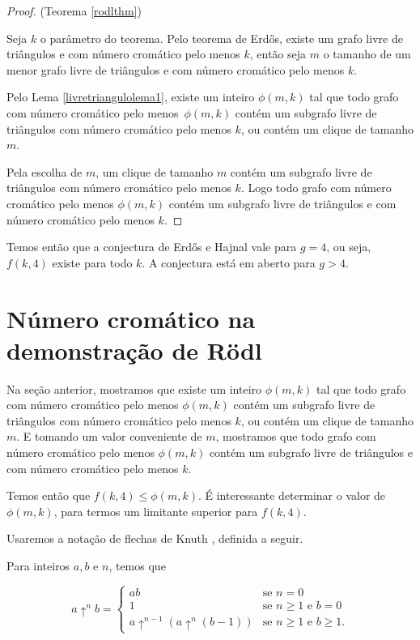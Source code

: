 \begin{proof}{(Teorema \ref{rodlthm})}

Seja $k$ o parâmetro do teorema. Pelo teorema de Erd\H{o}s, existe um grafo livre de triângulos e com número cromático pelo menos $k$, então seja $m$ o tamanho de um menor grafo livre de triângulos e com número cromático pelo menos $k$.

Pelo Lema \ref{livretriangulolema1}, existe um inteiro $\phi(m,k)$ tal que todo grafo com número cromático pelo menos~$\phi(m,k)$ contém um subgrafo livre de triângulos com número cromático pelo menos $k$, ou contém um clique de tamanho $m$.

Pela escolha de $m$, um clique de tamanho $m$ contém um subgrafo livre de triângulos com número cromático pelo menos $k$. Logo todo grafo com número cromático pelo menos $\phi(m,k)$ contém um subgrafo livre de triângulos e com número cromático pelo menos $k$.

\end{proof}

Temos então que a conjectura de Erd\H{o}s e Hajnal vale para $g=4$, ou seja, $f(k,4)$ existe para todo $k$. A conjectura está em aberto para $g > 4$.

\section{Número cromático na demonstração de R\"{o}dl}

Na seção anterior, mostramos que existe um inteiro $\phi(m,k)$ tal que todo grafo com número cromático pelo menos $\phi(m,k)$ contém um subgrafo livre de triângulos com número cromático pelo menos $k$, ou contém um clique de tamanho $m$. E tomando um valor conveniente de $m$, mostramos que todo grafo com número cromático pelo menos $\phi(m,k)$ contém um subgrafo livre de triângulos e com número cromático pelo menos $k$.

Temos então que $f(k,4) \leq \phi(m,k)$. É interessante determinar o valor de $\phi(m,k)$, para termos um limitante superior para $f(k,4)$.

Usaremos a notação de flechas de Knuth \cite{knuth1976mathematics}, definida a seguir.

\begin{definicao}\label{knuthuparrow}
Para inteiros $a,b$ e $n$, temos que

\[ a \uparrow^n b = \begin{cases} 
      ab & \text{se } n = 0\\
      1 & \text{se } n\geq 1 \text{ e }b=0\\
      a \uparrow^{n-1} (a \uparrow^n (b-1)) & \text{se } n\geq 1 \text{ e } b\geq 1.
   \end{cases}
\]
\end{definicao}

